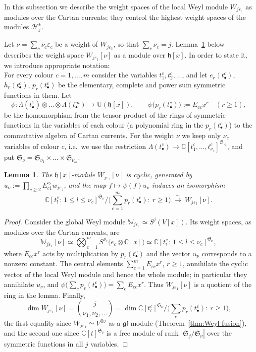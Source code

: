 \documentclass[11pt]{amsart}
\numberwithin{equation}{section}
\newtheorem{lemma}[equation]{Lemma}
\theoremstyle{definition}
\newcommand{\gl}{\mathfrak{gl}}
\newcommand{\fh}{\mathfrak{h}}
\newcommand{\U}{\mathrm{U}}
\newcommand{\bW}{\mathbb{W}}          %
\newcommand{\eps}{\varepsilon}
\newcommand{\Lam}{\Lambda}
\newcommand{\sS}{\mathfrak{S}}
\begin{document}
	In this subsection we describe the weight spaces of the local Weyl module $W_{j\eps_1}$ as modules over the Cartan currents; they control the highest weight spaces of the modules $\mathcal H_j^k$.
	
	Let $\nu=\sum_c\nu_c\eps_c$ be a weight of $W_{j\eps_1}$, so that $\sum_c\nu_c=j$. Lemma~\ref{lem:weight-space} below describes the weight space $W_{j\eps_1}[\nu]$ as a module over $\fh[x]$. In order to state it, we introduce appropriate notation:
	\\
	For every colour $c=1,\dots,m$ consider the variables $t^c_1,t^c_2,\dots$, and let $e_r(t^c_\bullet)$, $h_r(t^c_\bullet)$, $p_r(t^c_\bullet)$ be the elementary, complete and power sum symmetric functions in them. Let
	\[
	\psi\colon\Lam(t^1_\bullet)\otimes\dots\otimes\Lam(t^m_\bullet)\to\U(\fh[x]),\qquad \psi\big(p_r(t^c_\bullet)\big):=E_{cc}x^r\quad(r\ge1),
	\]
	be the homomorphism from the tensor product of the rings of symmetric functions in the variables of each colour (a polynomial ring in the $p_r(t^c_\bullet)$) to the commutative algebra of Cartan currents. For the weight $\nu$ we keep only $\nu_c$ variables of colour $c$, i.e.\ we use the restriction $\Lam(t^c_\bullet)\to\mathbb C[t^c_1,\dots,t^c_{\nu_c}]^{\sS_{\nu_c}}$, and put $\sS_\nu=\sS_{\nu_1}\times\dots\times\sS_{\nu_m}$.
	\begin{lemma}\label{lem:weight-space}
		The $\fh[x]$-module $W_{j\eps_1}[\nu]$ is cyclic, generated by $u_\nu:=\prod_{c\ge2}E_{c1}^{\nu_c}w_{j\eps_1}$, and the map $f\mapsto\psi(f)u_\nu$ induces an isomorphism
		\[
		\mathbb C[t^c_l:\ 1\le l\le\nu_c]^{\sS_\nu}\Big/\Big(\sum_{c=1}^mp_r(t^c_\bullet):\ r\ge1\Big)\ \xrightarrow{\ \sim\ }\ W_{j\eps_1}[\nu].
		\]
	\end{lemma}
	\begin{proof}
		Consider the global Weyl module $\bW_{j\eps_1}\simeq S^j(V[x])$. Its weight spaces, as modules over the Cartan currents, are
		\[
		\bW_{j\eps_1}[\nu]\simeq\bigotimes_{c=1}^mS^{\nu_c}\big(e_c\otimes\mathbb C[x]\big)\simeq\mathbb C[t^c_l:\ 1\le l\le\nu_c]^{\sS_\nu},
		\]
		where $E_{cc}x^r$ acts by multiplication by $p_r(t^c_\bullet)$ and the vector $u_\nu$ corresponds to a nonzero constant. The central elements $\sum_{c=1}^mE_{cc}x^r$, $r\ge1$, annihilate the cyclic vector of the local Weyl module and hence the whole module; in particular they annihilate $u_\nu$, and $\psi\big(\sum_cp_r(t^c_\bullet)\big)=\sum_cE_{cc}x^r$. Thus $W_{j\eps_1}[\nu]$ is a quotient of the ring in the lemma. Finally,
		\[
		\dim W_{j\eps_1}[\nu]=\binom{j}{\nu_1,\nu_2,\dots}=\dim\mathbb C[t^c_l]^{\sS_\nu}\Big/\Big(\sum_cp_r(t^c_\bullet):\ r\ge1\Big),
		\]
		the first equality since $W_{j\eps_1}\simeq V^{\otimes j}$ as a $\gl$-module (Theorem~\ref{thm:Weyl-fusion}), and the second one since $\mathbb C[t]^{\sS_\nu}$ is a free module of rank $|\sS_j/\sS_\nu|$ over the symmetric functions in all $j$ variables.
	\end{proof}
	
\end{document}
